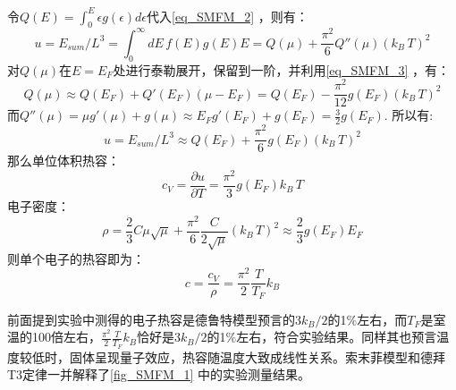 令$Q(E)=\int_0^{E} \epsilon g(\epsilon)d\epsilon$代入\autoref{eq_SMFM_2} ，则有：
\begin{equation}
u=E_{sum}/L^3=\int_0^{\infty} dE\,f(E)g(E)E=Q(\mu)+\frac{\pi^2}{6}Q''(\mu)(k_B\,T)^2
\end{equation}
对$Q(\mu)$在$E=E_F$处进行泰勒展开，保留到一阶，并利用\autoref{eq_SMFM_3} ，有：
\begin{equation}
Q(\mu)\approx Q(E_F)+Q'(E_F)(\mu-E_F)=Q(E_F)-\frac{\pi^2}{12}g(E_F)(k_B\,T)^2
\end{equation}
而$Q''(\mu)=\mu g'(\mu)+g(\mu)\approx E_Fg'(E_F)+g(E_F)=\frac{3}{2}g(E_F)$.
所以有:
\begin{equation}
u=E_{sum}/L^3\approx Q(E_F)+\frac{\pi^2}{6}g(E_F)(k_B\,T)^2
\end{equation}
那么单位体积热容：
\begin{equation}
c_V=\frac{\partial u}{\partial T}=\frac{\pi^2}{3}g(E_F)k_B\,T
\end{equation}
电子密度：
\begin{equation}
\rho=\frac{2}{3}C\mu\sqrt{\mu}+\frac{\pi^2}{6}\frac{C}{2\sqrt{\mu}}(k_B\,T)^2\approx \frac{2}{3}g(E_F)E_F
\end{equation}
则单个电子的热容即为：
\begin{equation}
c=\frac{c_V}{\rho}=\frac{\pi^2}{2}\frac{T}{T_F}k_B
\end{equation}

前面提到实验中测得的电子热容是德鲁特模型预言的$3k_B/2$的1$\%$左右，而$T_F$是室温的100倍左右，$\frac{\pi^2}{2}\frac{T}{T_F}k_B$恰好是$3k_B/2$的1$\%$左右，符合实验结果。同样其也预言温度较低时，固体呈现量子效应，热容随温度大致成线性关系。索末菲模型和德拜T3定律一并解释了\autoref{fig_SMFM_1} 中的实验测量结果。
